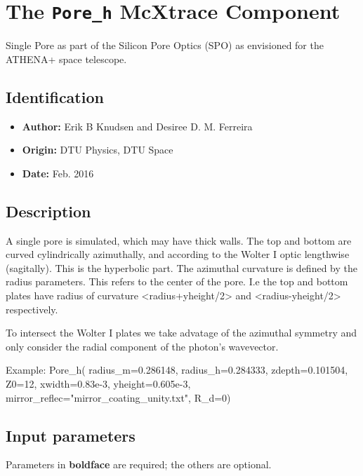 \section{The \texttt{Pore\_h} McXtrace Component}
Single Pore as part of the Silicon Pore Optics (SPO) as envisioned for the ATHENA+ space telescope.

\subsection*{Identification}
\begin{itemize}
  \item \textbf{Author:} Erik B Knudsen and Desiree D. M. Ferreira
  \item \textbf{Origin:} DTU Physics, DTU Space
  \item \textbf{Date:} Feb. 2016
\end{itemize}

\subsection*{Description}
A single pore is simulated, which may have thick walls. The top and bottom are curved cylindrically azimuthally, and according to the Wolter I optic lengthwise (sagitally). This is the hyperbolic part. The azimuthal curvature is defined by the radius parameters. This refers to the center of the pore. I.e the top and bottom plates have radius of curvature \textless{}radius+yheight/2\textgreater{} and \textless{}radius-yheight/2\textgreater{} respectively.

To intersect the Wolter I plates we take advatage of the azimuthal symmetry and only consider the radial component of the photon's wavevector.

Example: Pore\_h( radius\_m=0.286148, radius\_h=0.284333, zdepth=0.101504, Z0=12, xwidth=0.83e-3, yheight=0.605e-3, mirror\_reflec="mirror\_coating\_unity.txt", R\_d=0)

\subsection*{Input parameters}
Parameters in \textbf{boldface} are required; the others are optional.

